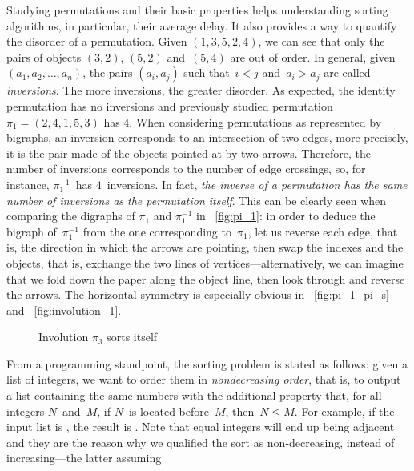 Studying permutations and their basic properties helps understanding
sorting algorithms, in particular, their average delay. It also
provides a way to quantify the disorder of a permutation. Given
\((1,3,5,2,4)\), we can see that only the pairs of objects \((3,2)\),
\((5,2)\) and~\((5,4)\) are out of order. In general, given \((a_1,
a_2, \dots, a_n)\), the pairs \((a_i,a_j)\) such that~\(i < j\)
and~\(a_i > a_j\) are called \emph{inversions}. The more inversions,
the greater disorder. As expected, the identity permutation has no
inversions and previously studied permutation \(\pi_1 = (2,4,1,5,3)\)
has \(4\). When considering permutations as represented by bigraphs,
an inversion corresponds to an intersection of two edges, more
precisely, it is the pair made of the objects pointed at by two
arrows. Therefore, the number of inversions corresponds to the number
of edge crossings, so, for instance, \(\pi_1^{-1}\)~has
\(4\)~inversions. In fact, \emph{the inverse of a permutation has the
  same number of inversions as the permutation itself}. This can be
clearly seen when comparing the digraphs of \(\pi_1\) and
\(\pi_1^{-1}\) in \fig~\vref{fig:pi_1}: in order to deduce the bigraph
of~\(\pi_1^{-1}\) from the one corresponding to~\(\pi_1\), let us
reverse each edge, that is, the direction in which the arrows are
pointing, then swap the indexes and the objects, that is, exchange the
two lines of vertices---alternatively, we can imagine that we fold
down the paper along the object line, then look through and reverse
the arrows. The horizontal symmetry is especially obvious in
\fig~\vref{fig:pi_1_pi_s} and \fig~\vref{fig:involution_1}.
\begin{figure}[h]
\centering
{}
\qquad\qquad
{}
\caption{Involution \(\pi_3\) sorts itself\label{fig:involution}}
\end{figure}
From a programming standpoint, the sorting problem is stated as
follows: given a list of integers, we want to order them in
\emph{nondecreasing order}, that is, to output a list containing the
same numbers with the additional property that, for all integers
\(N\)~and~\(M\), if \(N\)~is located before~\(M\), then~\(N \leqslant
M\). For example, if the input list is \erlcode{[6,3,1,7,5,3,0]}, the
result is \erlcode{[0,1,3,3,5,6,7]}. Note that equal integers will end
up being adjacent and they are the reason why we qualified the sort as
non\hyp{}decreasing, instead of increasing---the latter assuming
